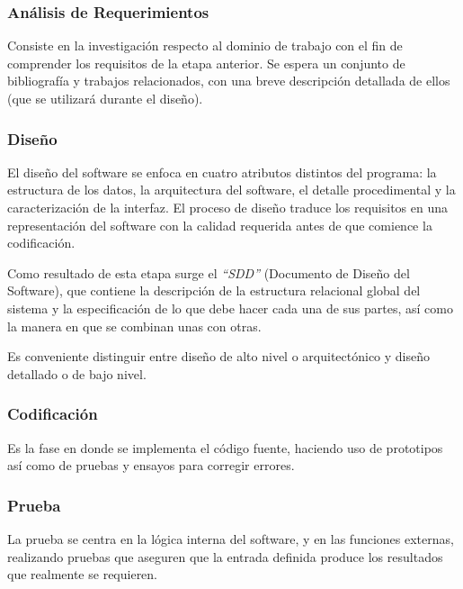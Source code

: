 \subsubsection{Análisis de Requerimientos}
\par Consiste en la investigación respecto al dominio de trabajo con el fin de comprender los requisitos de la etapa anterior. Se espera un conjunto de bibliografía y trabajos relacionados, con una breve descripción detallada de ellos (que se utilizará durante el diseño). 	
	
\subsubsection{Diseño}
\par El diseño del software se enfoca en cuatro atributos distintos del programa: la estructura de los datos, la arquitectura del software, el detalle procedimental y la caracterización de la interfaz. El proceso de diseño traduce los requisitos en una representación del software con la calidad requerida antes de que comience la codificación.
\par Como resultado de esta etapa surge el \textit{``SDD''} (Documento de Diseño del Software), que contiene la descripción de la estructura relacional global del sistema y la especificación de lo que debe hacer cada una de sus partes, así como la manera en que se combinan unas con otras.
\par Es conveniente distinguir entre diseño de alto nivel o arquitectónico y diseño detallado o de bajo nivel.

\subsubsection{Codificación}
\par Es la fase en donde se implementa el código fuente, haciendo uso de prototipos así como de pruebas y ensayos para corregir errores.

\subsubsection{Prueba}
\par La prueba se centra en la lógica interna del software, y en las funciones externas, realizando pruebas que aseguren que la entrada definida produce los resultados que realmente se requieren.

